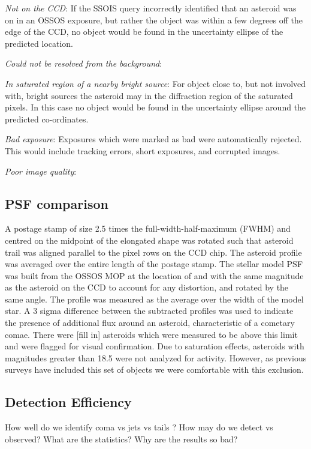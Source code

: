 \documentclass[iop,apj]{emulateapj}
\begin{document}
\textit{Not on the CCD}:
If the SSOIS query incorrectly identified that an asteroid was on in an OSSOS exposure, but rather the object was within a few degrees off the edge of the CCD, no object would be found in the uncertainty ellipse of the predicted location.

\textit{Could not be resolved from the background}:


\textit{In saturated region of a nearby bright source}:
For object close to, but not involved with, bright sources the asteroid may in the diffraction region of the saturated pixels. In this case no object would be found in the uncertainty ellipse around the predicted co-ordinates.

\textit{Bad exposure}:
Exposures which were marked as bad were automatically rejected. This would include tracking errors, short exposures, and corrupted images. 

\textit{Poor image quality}:


\subsection{PSF comparison}

A postage stamp of size 2.5 times the full-width-half-maximum (FWHM) and centred on the midpoint of the elongated shape was rotated such that asteroid trail was aligned parallel to the pixel rows on the CCD chip. The asteroid profile was averaged over the entire length of the postage stamp. The stellar model PSF was built from the OSSOS MOP at the location of and with the same magnitude as the asteroid on the CCD to account for any distortion, and rotated by the same angle.  The profile was measured as the average over the width of the model star. A 3 sigma difference between the subtracted profiles was used to indicate the presence of additional flux around an asteroid, characteristic of a cometary comae. There were [fill in] asteroids which were measured to be above this limit and were flagged for visual confirmation. Due to saturation effects, asteroids with magnitudes greater than 18.5 were not analyzed for activity. However, as previous surveys have included this set of objects \citep{hsieh15} we were comfortable with this exclusion.

\subsection{Detection Efficiency}

How well do we identify coma vs jets vs tails ? How may do we detect vs observed? What are the statistics? Why are the results so bad?
\end{document}
